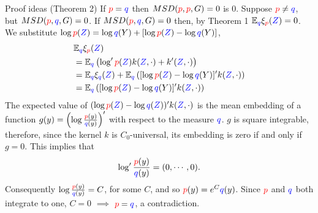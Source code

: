 \begin{frame}
\begin{columns}
\begin{column}{.33\linewidth}
\vspace{-0.75cm}
\begin{block}{Proof ideas (Theorem 2)}
 If ${ \color{red} p}={ \color{blue} q}$ then $MSD({\color{red} p},{ \color{red} p},G) =0$ is $0$. Suppose
${ \color{red} p}\neq { \color{blue} q}$, but $MSD({\color{red} p},{ \color{blue} q},G) =0$. If $MSD({\color{red} p},{ \color{blue} q},G) =0$ then, by Theorem 1 
$\mathbb{E}_{{ \color{blue} q}}\xi_{{ \color{red} p}}({ \color{blue} Z})=0$. We substitute $\log { \color{red} p}({ \color{blue} Z})=\log { \color{blue} q}(Y)+[\log { \color{red} p}({ \color{blue} Z})-\log { \color{blue} q}(Y)]$,
\begin{align*}
 & \mathbb{E}_{{ \color{blue} q}}\xi_{{ \color{red} p}}({ \color{blue} Z})\\
 & =\mathbb{E}_{{ \color{blue} q}}\left( \log' { \color{red} p}({ \color{blue} Z})k({ \color{blue} Z},\cdot)+ k'({ \color{blue} Z},\cdot)\right)\\
 & =\mathbb{E}_{{ \color{blue} q}}\xi_{{ \color{blue} q}}({ \color{blue} Z})+\mathbb{E}_{{ \color{blue} q}}\left([\log { \color{red} p}({ \color{blue} Z})-\log { \color{blue} q}(Y)]'k({ \color{blue} Z},\cdot)\right)\\
 & =\mathbb{E}_{{ \color{blue} q}}\left( [\log { \color{red} p}({ \color{blue} Z})-\log { \color{blue} q}(Y)]' k({ \color{blue} Z},\cdot)\right)
\end{align*}
The expected value of $(\log { \color{red} p}({ \color{blue} Z})-\log { \color{blue} q}({ \color{blue} Z}))' k({ \color{blue} Z},\cdot)$ is the mean embedding of
a function $g(y)=\left(\log\frac{{ \color{red} p}(y)}{{ \color{blue} q}(y)}\right)'$ with respect
to the measure ${ \color{blue} q}$.  $g$ is square integrable,
therefore, since the kernel $k$ is $C_0$-universal, %
its embedding is zero if and only if $g=0$. This implies that 
\[
\log'\frac{{ \color{red} p}(y)}{{ \color{blue} q}(y)}=(0,\cdots,0).
\]
Consequently  $\log\frac{{ \color{red} p}(y)}{{ \color{blue} q}(y)}=C$, for some $C$, and so  ${ \color{red} p}(y)=e^{C}{ \color{blue} q}(y)$. Since ${ \color{red} p}$ and ${ \color{blue} q}$ both integrate
to one, $C=0$ $\implies$ ${ \color{red} p}={ \color{blue} q}$,  a contradiction.
\end{block}


\end{column}
\end{columns}
\end{frame}
